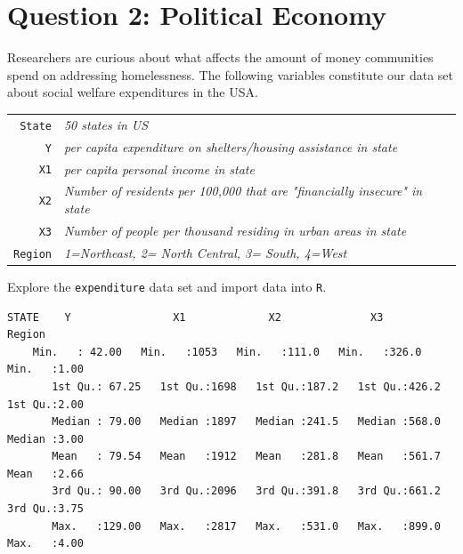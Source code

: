 \documentclass[12pt,letterpaper]{article}
\begin{document}
\newpage

	\section*{Question 2: Political Economy}

\noindent Researchers are curious about what affects the amount of money communities spend on addressing homelessness. The following variables constitute our data set about social welfare expenditures in the USA. \\
\vspace{.5cm}


\begin{tabular}{r|l}
	\texttt{State} &\emph{50 states in US} \\
	\texttt{Y} & \emph{per capita expenditure on shelters/housing assistance in state}\\
	\texttt{X1} &\emph{per capita personal income in state} \\
	\texttt{X2} &  \emph{Number of residents per 100,000 that are "financially insecure" in state}\\
	\texttt{X3} &  \emph{Number of people per thousand residing in urban areas in state} \\
	\texttt{Region} &  \emph{1=Northeast, 2= North Central, 3= South, 4=West} \\
\end{tabular}

\vspace{.5cm}
\noindent Explore the \texttt{expenditure} data set and import data into \texttt{R}.
\vspace{.5cm}

  
\begin{verbatim} 
STATE    Y                X1             X2              X3            Region    
    Min.   : 42.00   Min.   :1053   Min.   :111.0   Min.   :326.0   Min.   :1.00  
	   1st Qu.: 67.25   1st Qu.:1698   1st Qu.:187.2   1st Qu.:426.2   1st Qu.:2.00  
	   Median : 79.00   Median :1897   Median :241.5   Median :568.0   Median :3.00  
	   Mean   : 79.54   Mean   :1912   Mean   :281.8   Mean   :561.7   Mean   :2.66  
	   3rd Qu.: 90.00   3rd Qu.:2096   3rd Qu.:391.8   3rd Qu.:661.2   3rd Qu.:3.75  
	   Max.   :129.00   Max.   :2817   Max.   :531.0   Max.   :899.0   Max.   :4.00   
\end{verbatim}
\end{document}
